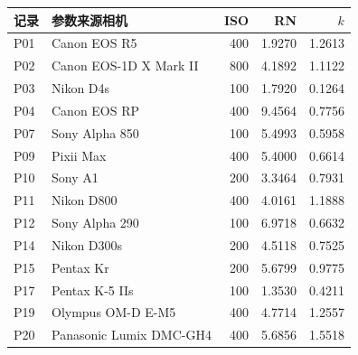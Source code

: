 \begin{inlinetable}
\centering
\caption{图\ref{fig:ptc} 的光子转移曲线参数（读出噪声 RN 单位为 DN，转换增益 $k$ 单位为 DN/电子）。}\label{tab:ptc}
\footnotesize
\renewcommand{\arraystretch}{0.82}
\setlength{\tabcolsep}{3pt}
\begin{tabular}{llrrr}
\toprule
记录 & 参数来源相机 & ISO & RN & $k$ \\
\midrule
P01 & Canon EOS R5 & 400 & 1.9270 & 1.2613 \\
P02 & Canon EOS-1D X Mark II & 800 & 4.1892 & 1.1122 \\
P03 & Nikon D4s & 100 & 1.7920 & 0.1264 \\
P04 & Canon EOS RP & 400 & 9.4564 & 0.7756 \\
P07 & Sony Alpha 850 & 100 & 5.4993 & 0.5958 \\
P09 & Pixii Max & 400 & 5.4000 & 0.6614 \\
P10 & Sony A1 & 200 & 3.3464 & 0.7931 \\
P11 & Nikon D800 & 400 & 4.0161 & 1.1888 \\
P12 & Sony Alpha 290 & 100 & 6.9718 & 0.6632 \\
P14 & Nikon D300s & 200 & 4.5118 & 0.7525 \\
P15 & Pentax Kr & 200 & 5.6799 & 0.9775 \\
P17 & Pentax K-5 IIs & 100 & 1.3530 & 0.4211 \\
P19 & Olympus OM-D E-M5 & 400 & 4.7714 & 1.2557 \\
P20 & Panasonic Lumix DMC-GH4 & 400 & 5.6856 & 1.5518 \\
\bottomrule
\end{tabular}
\end{inlinetable}
